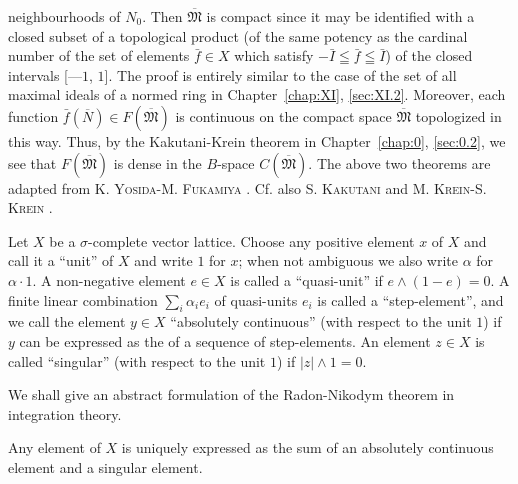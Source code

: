 neighbourhoods of $N_0$. Then $\overline{\mathfrak{M}}$ is compact since it may be identified with a closed subset of a topological product (of the same potency as the cardinal number of the set of elements $\bar{f} \in X$ which satisfy $-\bar{I} \leqq \bar{f} \leqq \bar{I}$) of the closed intervals [---$1$, $1$]. The proof is entirely similar to the case of the set of all maximal ideals of a normed ring in Chapter~\ref{chap:XI}, \ref{sec:XI.2}. Moreover, each function $\bar{f}(\overline{N}) \in F(\overline{\mathfrak{M}})$ is continuous on the compact space $\overline{\mathfrak{M}}$ topologized in this way. Thus, by the Kakutani-Krein theorem in Chapter~\ref{chap:0}, \ref{sec:0.2}, we see that $F(\overline{\mathfrak{M}})$ is dense in the $B$-space $C(\overline{\mathfrak{M}})$. The above two theorems are adapted from K. \textsc{Yosida}-M. \textsc{Fukamiya} \cite{yosida359}. Cf. also S. \textsc{Kakutani} \cite{kakutani128} and M. \textsc{Krein}-S. \textsc{Krein} \cite{krein166}. 


\label{sec:XII.6}

Let $X$ be a $\sigma$-complete vector lattice. Choose any positive element $x$ of $X$ and call it a ``unit'' of $X$ and write $1$ for $x$; when not ambiguous we also write $\alpha$ for $\alpha \cdot 1$. A non-negative element $e \in X$ is called a ``quasi-unit'' if $e \wedge (1 - e) = 0$. A finite linear combination $\sum\limits_{i} \alpha_{i} e_{i}$ of quasi-units $e_{i}$ is called a ``step-element'', and we call the element $y \in X$ ``absolutely continuous'' (with respect to the unit $1$) if $y$ can be expressed as the \Olim of a sequence of step-elements. An element $z \in X$ is called ``singular'' (with respect to the unit $1$) if $|z| \wedge 1 = 0$. 

We shall give an abstract formulation of the Radon-Nikodym theorem in integration theory. 

\begin{theoremu} Any element of $X$ is uniquely expressed as the sum of an absolutely continuous element and a singular element. 
\end{theoremu}

